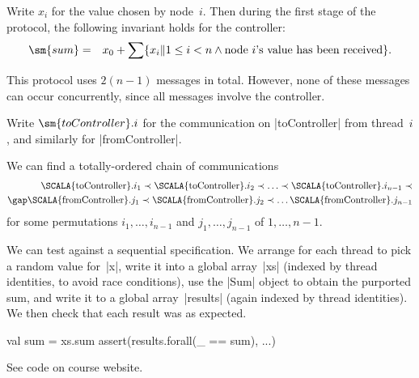 \documentclass[notes,color]{sepslide0}
\def\set#1{\{#1\}}
\begin{document}

\begin{slide}

Write $x_i$ for the value chosen by node~$i$.  Then during the first stage of
the protocol, the following invariant holds for the controller:
%
\begin{eqnarray*}
\sm{sum} & = & 
   x_0 + \sum \set{x_i \| 1 \le i < n \land 
           \mbox{node~$i$'s value has been received}}.
\end{eqnarray*}
\end{slide}


\begin{slide}

This protocol uses $2(n-1)$ messages in total.  However, none of these
messages can occur concurrently, since all messages involve the
controller.

Write $\sm{toController}.i$ for the communication on |toController| from
thread~$i$, and similarly for |fromController|.

We can find a totally-ordered chain of communications
\[
\begin{align}
\mbox{\SCALA{toController}}.i_1 \prec \mbox{\SCALA{toController}}.i_2 
  \prec \ldots  \prec \mbox{\SCALA{toController}}.i_{n-1} \prec \\
\gap
  \mbox{\SCALA{fromController}}.j_1 \prec \mbox{\SCALA{fromController}}.j_2 
  \prec \ldots \mbox{\SCALA{fromController}}.j_{n-1}
\end{align}
\]
for some permutations $i_1, \ldots, i_{n-1}$ and $j_1, \ldots, j_{n-1}$ of $1,
\ldots, n-1$. 
\end{slide}


\begin{slide}

We can test against a sequential specification.  We arrange for each thread to
pick a random value for~|x|, write it into a global array~|xs| (indexed by
thread identities, to avoid race conditions), use the |Sum| object to obtain
the purported sum, and write it to a global array~|results| (again indexed by
thread identities).  We then check that each result was as expected.
\begin{scala}
  val sum = xs.sum
  assert(results.forall(_ == sum), ...)
\end{scala}

See code on course website.
\end{slide}
\end{document}

